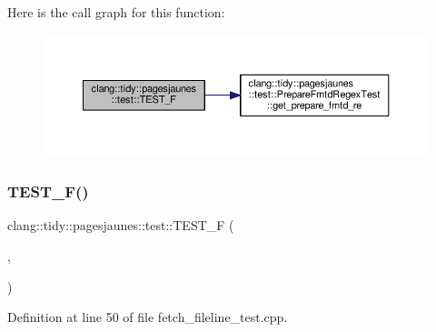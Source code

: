 Here is the call graph for this function\+:
\nopagebreak
\begin{figure}[H]
\begin{center}
\leavevmode
\includegraphics[width=350pt]{namespaceclang_1_1tidy_1_1pagesjaunes_1_1test_adefa0c55e6339f7e62c34be0a20923fa_cgraph}
\end{center}
\end{figure}
\mbox{\label{namespaceclang_1_1tidy_1_1pagesjaunes_1_1test_a10fd631fb59f61de469bea299040db9e}} 
\subsubsection{\texorpdfstring{T\+E\+S\+T\+\_\+\+F()}{TEST\_F()}\hspace{0.1cm}{\footnotesize\ttfamily [5/57]}}
{\footnotesize\ttfamily clang\+::tidy\+::pagesjaunes\+::test\+::\+T\+E\+S\+T\+\_\+F (\begin{DoxyParamCaption}\item[{\hyperlink{classclang_1_1tidy_1_1pagesjaunes_1_1test_1_1_fetch_fileline_test}{Fetch\+Fileline\+Test}}]{,  }\item[{Fileline\+Matching}]{ }\end{DoxyParamCaption})}



Definition at line 50 of file fetch\+\_\+fileline\+\_\+test.\+cpp.


